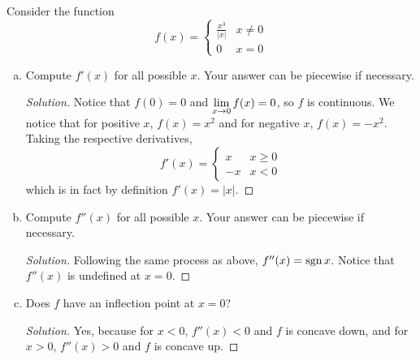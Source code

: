 \documentclass{agony}
\begin{document}
\question Consider the function
\[ f(x) = \begin{cases}
    \frac{x^3}{|x|} & x \neq 0 \\
    0               & x = 0
  \end{cases} \]
\begin{enumerate}[(a)]
  \item Compute $f'(x)$ for all possible $x$. Your answer can be piecewise if necessary.
        \begin{proof}[Solution]
          Notice that $f(0)=0$ and $\lim\limits_{x\to0}f(x)=0$, so $f$ is continuous.
          We notice that for positive $x$, $f(x)=x^2$ and for negative $x$, $f(x)=-x^2$.
          Taking the respective derivatives,
          \[ f'(x)=\begin{cases} x & x\geq0 \\ -x & x<0 \end{cases} \]
          which is in fact by definition $f'(x)=|x|$.
        \end{proof}
  \item Compute $f''(x)$ for all possible $x$. Your answer can be piecewise if necessary.
        \begin{proof}[Solution]
          Following the same process as above, $f''(x)=\operatorname{sgn} x$.
          Notice that $f''(x)$ is undefined at $x=0$.
        \end{proof}
  \item Does $f$ have an inflection point at $x=0$?
        \begin{proof}[Solution]
          Yes, because for $x < 0$, $f''(x) < 0$ and $f$ is concave down,
          and for $x > 0$, $f''(x) > 0$ and $f$ is concave up.
        \end{proof}
\end{enumerate}
\end{document}
